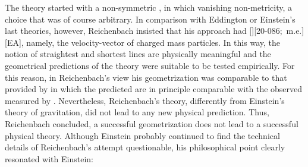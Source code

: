 \documentclass[draft]{article}
\renewcommand{\me}{;~m.e.{}}
\begin{document}
The theory started with a non-symmetric \Gtmn, in which vanishing non-metricity, a choice that was of course arbitrary. In comparison with Eddington or Einstein's last theories, however, Reichenbach insisted that his approach had [][20-086\me][EA], namely, the velocity-vector of charged mass particles. In this way, the notion of straightest and shortest lines are physically meaningful and the geometrical predictions of the theory were suitable to be tested empirically. For this reason, in Reichenbach's view his geometrization was comparable to that provided by \gr in which the predicted \gmn are in principle comparable with the observed \gmn measured by \rac. Nevertheless, Reichenbach's theory, differently from Einstein's theory of gravitation, did not lead to any new physical prediction. Thus, Reichenbach concluded, a successful geometrization does not lead to a successful physical theory. Although Einstein probably continued to find the technical details of Reichenbach's attempt questionable, his philosophical point clearly resonated with Einstein:
\end{document}
